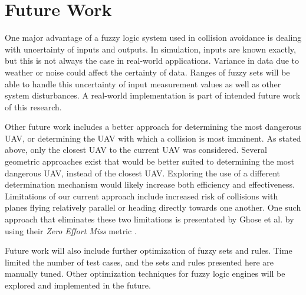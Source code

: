 \documentclass[10pt, conference, compsocconf]{IEEEtran}
\begin{document}
\section{Future Work}
One major advantage of a fuzzy logic system used in collision avoidance is dealing with uncertainty of inputs and outputs. In simulation, inputs are known exactly, but this is not always the case in real-world applications. Variance in data due to weather or noise could affect the certainty of data.  Ranges of fuzzy sets will be able to handle this uncertainty of input measurement values as well as other system disturbances. A real-world implementation is part of intended future work of this research.

Other future work includes a better approach for determining the most dangerous UAV, or determining the UAV with which a collision is most imminent. As stated above, only the closest UAV to the current UAV was considered.  Several geometric approaches exist that would be better suited to determining the most dangerous UAV, instead of the closest UAV.  Exploring the use of a different determination mechanism would likely increase both efficiency and effectiveness.  Limitations of our current approach include increased risk of collisions with planes flying relatively parallel or heading directly towards one another. One such approach that eliminates these two limitations is presentated by Ghose et al. by using their {\it Zero Effort Miss} metric \cite{joelthesis}.

Future work will also include further optimization of fuzzy sets and rules. Time limited the number of test cases, and the sets and rules presented here are manually tuned. Other optimization techniques for fuzzy logic engines will be explored and implemented in the future.
  


\end{document}
